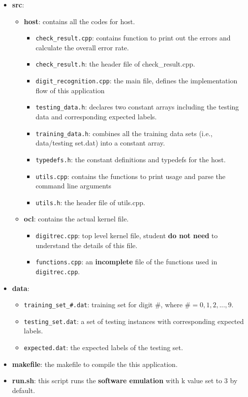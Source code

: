 \documentclass[paper=letter, fontsize=10pt]{scrartcl} %
\numberwithin{equation}{section} %
\numberwithin{figure}{section} %
\numberwithin{table}{section} %
\begin{document}
\begin{itemize}
  \item \textbf{src}: 
   	\begin{itemize}
	 	\item \textbf{host}: contains all the codes for host.
		 	\begin{itemize}
	 			\item \texttt{check\_result.cpp}: contains function to print out the errors and calculate the overall error rate.
				\item \texttt{check\_result.h}: the header file of check\_result.cpp.
	 			\item \texttt{digit\_recognition.cpp}: the main file, defines the implementation flow of this application
				\item \texttt{testing\_data.h}: declares two constant arrays including the testing data and corresponding expected labels. 
				\item \texttt{training\_data.h}: combines all the training data sets (i.e., data/testing set.dat) into a constant array. 
				\item \texttt{typedefs.h}: the constant definitions and typedefs for the host. 
				\item \texttt{utils.cpp}: contains the functions to print usage and parse the command line arguments
				\item \texttt{utils.h}: the header file of utils.cpp.
			\end{itemize}
		\item \textbf{ocl}: contains the actual kernel file.
		 	\begin{itemize}
	 			\item \texttt{digitrec.cpp}: top level kernel file, student \textbf{do not need} to understand the details of this file.
				\item \texttt{functions.cpp}: an \textbf{ incomplete} file of the functions used in \texttt{digitrec.cpp}.
			\end{itemize}
	\end{itemize}
  \item \textbf{data}:
  	\begin{itemize}
	 	\item \texttt{training\_set\_\#.dat}: training set for digit $\#$, where $\#=0,1,2,...,9$.
		\item \texttt{testing\_set.dat}: a set of testing instances with corresponding expected labels.
		\item \texttt{expected.dat}: the expected labels of the testing set.
	\end{itemize}
  \item \textbf{makefile}: the makefile to compile the this application.
  \item \textbf{run.sh}: this script runs the \textbf{software emulation} with k value set to 3 by default.
\end{itemize}
\end{document}
